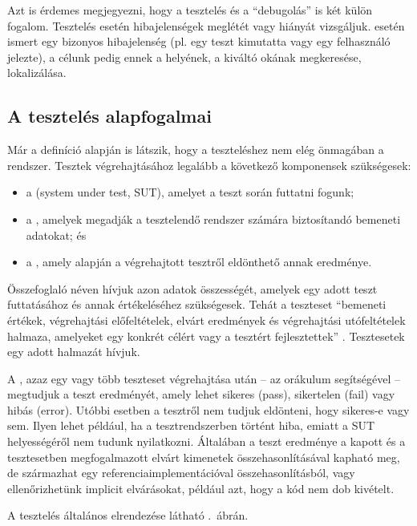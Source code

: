 Azt is érdemes megjegyezni, hogy a tesztelés és a ``debugolás'' is két külön fogalom. Tesztelés esetén hibajelenségek meglétét vagy hiányát vizsgáljuk.  esetén ismert egy bizonyos hibajelenség (pl. egy teszt kimutatta vagy egy felhasználó jelezte), a célunk pedig ennek a helyének, a kiváltó okának megkeresése, lokalizálása.

\subsection{A tesztelés alapfogalmai}
Már a definíció alapján is látszik, hogy a teszteléshez nem elég önmagában a rendszer. Tesztek végrehajtásához legalább a következő komponensek szükségesek: 
\begin{itemize}
\item a  (system under test, SUT), amelyet a teszt során futtatni fogunk;
\item a , amelyek megadják a tesztelendő rendszer számára biztosítandó bemeneti adatokat; és
\item a , amely alapján a végrehajtott tesztről eldönthető annak eredménye.
\end{itemize}

Összefoglaló néven  hívjuk azon adatok összességét, amelyek egy adott teszt futtatásához és annak értékeléséhez szükségesek. Tehát a teszteset ``bemeneti értékek, végrehajtási előfeltételek, elvárt eredmények és végrehajtási utófeltételek halmaza, amelyeket egy konkrét célért vagy a tesztért fejlesztettek'' \cite{HTB-glossary,IEEE-24765}. Tesztesetek egy adott halmazát  hívjuk.

A , azaz egy vagy több teszteset végrehajtása után \cite{IEEE-24765} -- az orákulum segítségével -- megtudjuk a teszt eredményét, amely lehet sikeres (pass), sikertelen (fail) vagy hibás (error). Utóbbi esetben a tesztről nem tudjuk eldönteni, hogy sikeres-e vagy sem. Ilyen lehet például, ha a tesztrendszerben történt hiba, emiatt a SUT helyességéről nem tudunk nyilatkozni. 
Általában a teszt eredménye a kapott és a tesztesetben megfogalmazott elvárt kimenetek összehasonlításával kapható meg, de származhat egy referenciaimplementációval összehasonlításból, vagy ellenőrizhetünk implicit elvárásokat, például azt, hogy a kód nem dob kivételt.

A tesztelés általános elrendezése látható .~ábrán.

